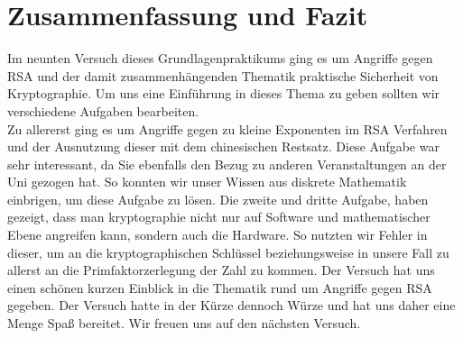 \documentclass{article}
\begin{document}
\section{Zusammenfassung und Fazit}
Im neunten Versuch dieses Grundlagenpraktikums ging es um Angriffe gegen RSA und der damit zusammenhängenden Thematik praktische Sicherheit von Kryptographie. Um uns eine Einführung in dieses Thema zu geben sollten wir verschiedene Aufgaben bearbeiten.\\
Zu allererst ging es um Angriffe gegen zu kleine Exponenten im RSA Verfahren und der Ausnutzung dieser mit dem chinesischen Restsatz. Diese Aufgabe war sehr interessant, da Sie ebenfalls den Bezug zu anderen Veranstaltungen an der Uni gezogen hat. So konnten wir unser Wissen aus diskrete Mathematik einbrigen, um diese Aufgabe zu lösen.
Die zweite und dritte Aufgabe, haben gezeigt, dass man kryptographie nicht nur auf Software und mathematischer Ebene angreifen kann, sondern auch die Hardware. So nutzten wir Fehler in dieser, um an die kryptographischen Schlüssel beziehungsweise in unsere Fall zu allerst an die Primfaktorzerlegung der Zahl zu kommen.
Der Versuch hat uns einen schönen kurzen Einblick in die Thematik rund um Angriffe gegen RSA gegeben. Der Versuch hatte in der Kürze dennoch Würze und hat uns daher eine Menge Spaß bereitet. Wir freuen uns auf den nächsten Versuch. \\ 
\newpage
%
%
\end{document}
